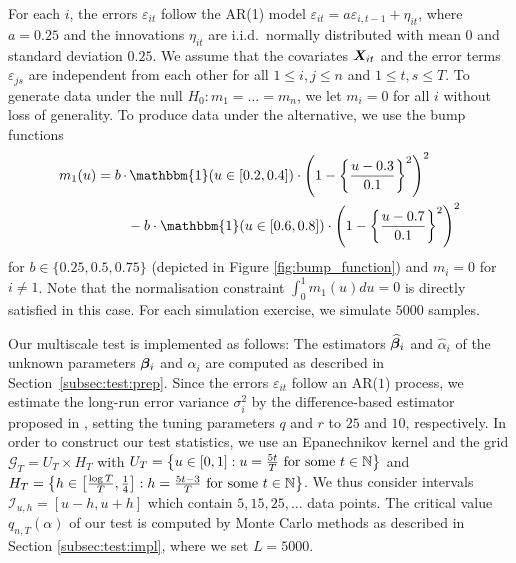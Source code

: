 \documentclass[12pt]{article}
\begin{document}
For each $i$, the errors $\varepsilon_{it}$ follow the AR(1) model $\varepsilon_{it} = a \varepsilon_{i, t-1} + \eta_{it}$, where $a = 0.25$ and the innovations $\eta_{it}$ are i.i.d.\ normally distributed with mean $0$ and standard deviation $0.25$. We assume that the covariates $\boldsymbol{X}_{it}$ and the error terms $\varepsilon_{js}$ are independent from each other for all $1 \leq i,j \leq n$ and $1 \leq t, s \leq T$. 
To generate data under the null $H_0: m_1 = \ldots = m_n$, we let $m_i = 0$ for all $i$ without loss of generality. To produce data under the alternative, we use the bump functions
\begin{align*}
m_1(u) =  b \,\cdot &\,\mathbbm{1}(u \in [0.2, 0.4]) \cdot \left(1 - \left\{\frac{u - 0.3}{0.1}\right\}^2\right)^2 \\
&- b \cdot\mathbbm{1}(u \in [0.6, 0.8]) \cdot \left(1 - \left\{\frac{u - 0.7}{0.1}\right\}^2\right)^2 
\end{align*}
for $b \in \{ 0.25, 0.5, 0.75 \}$ (depicted in Figure \ref{fig:bump_function}) and $m_i = 0$ for $i \neq 1$. Note that the normalisation constraint $\int_0^1 m_1(u) du = 0$ is directly satisfied in this case. For each simulation exercise, we simulate $5000$ samples. 


Our multiscale test is implemented as follows: The estimators $\widehat{\bm{\beta}}_i$ and $\widehat{\alpha}_i$ of the unknown parameters $\bm{\beta}_i$ and $\alpha_i$ are computed as described in Section~\ref{subsec:test:prep}. Since the errors $\varepsilon_{it}$ follow an AR($1$) process, we estimate the long-run error variance $\sigma_i^2$ by the difference-based estimator proposed in \cite{KhismatullinaVogt2020}, setting the tuning parameters $q$ and $r$ to $25$ and $10$, respectively. In order to construct our test statistics, we use an Epanechnikov kernel and the grid $\mathcal{G}_T = U_T \times H_T$ with 
$U_T  = \big\{ u \in [0,1]: u = \textstyle{\frac{5t}{T}} \text{ for some } t \in \mathbb{N} \big\}$
and
$H_T = \big\{ h \in \big[ \textstyle{\frac{\log T}{T}}, \textstyle{\frac{1}{4}} \big]:  h = \textstyle{\frac{5 t -3}{T}} \text{ for some } t \in \mathbb{N} \big\}$. 
We thus consider intervals $\mathcal{I}_{u, h} = [u-h, u+h]$ which contain $5, 15, 25, \ldots$ data points. The critical value $q_{n,T}(\alpha)$ of our test is computed by Monte Carlo methods as described in Section \ref{subsec:test:impl}, where we set $L=5000$. 
\end{document}
